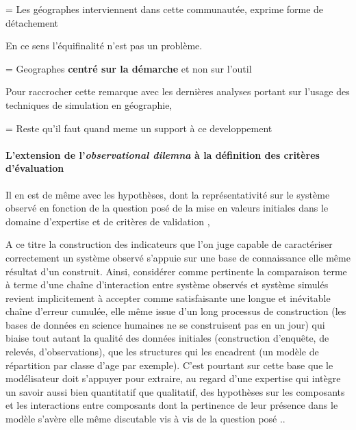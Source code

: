 = Les géographes interviennent dans cette communautée, exprime forme de détachement


En ce sens l'équifinalité n'est pas un problème.

= Geographes \textbf{centré sur la démarche} et non sur l'outil

Pour raccrocher cette remarque avec les dernières analyses portant sur l'usage des techniques de simulation en géographie,


= Reste qu'il faut quand meme un support à ce developpement










\paragraph{L'extension de l'\textit{observational dilemna} à la définition des critères d'évaluation}


Il en est de même avec les hypothèses, dont la représentativité sur le système observé en fonction de la question posé  de la mise en valeurs initiales dans le domaine d'expertise et de critères de validation ,


A ce titre la construction des indicateurs que l'on juge capable de caractériser correctement un système observé s'appuie sur une base de connaissance elle même résultat d'un construit. Ainsi, considérer comme pertinente la comparaison terme à terme d'une chaîne d'interaction entre système observés et système simulés  revient implicitement à accepter comme satisfaisante une longue et inévitable chaîne d'erreur cumulée, elle même issue d'un long processus de construction (les bases de données en science humaines ne se construisent pas en un jour) qui biaise tout autant la qualité des données initiales (construction d'enquête, de relevés, d'observations), que les structures qui les encadrent (un modèle de répartition par classe d'age par exemple). C'est pourtant sur cette base que le modélisateur doit s'appuyer pour extraire, au regard d'une expertise qui intègre un savoir aussi bien quantitatif que qualitatif, des hypothèses sur les composants et les interactions entre composants dont la pertinence de leur présence dans le modèle s'avère elle même discutable vis à vis de la question posé ..










